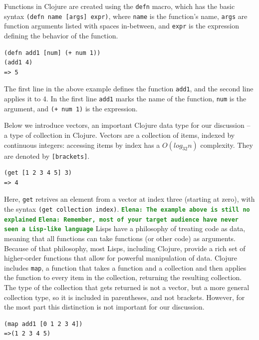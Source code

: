 \documentclass[12pt]{article}
\newcommand{\comment}[1]{{\bf \tt  {#1}}}
\newcommand{\emcomment}[1]{\textcolor{ForestGreen}{\comment{Elena: {#1}}}}
\newcommand{\clocode}[1]{{\texttt {#1}}}
\begin{document}
Functions in Clojure are created using the \clocode{defn} macro, which has the basic syntax \clocode{(defn name [args] expr)}, where \clocode{name} is the function's name, \clocode{args} are function arguments listed with spaces in-between, and \clocode{expr} is the expression defining the behavior of the function. 
\begin{verbatim}
(defn add1 [num] (+ num 1))
(add1 4)
=> 5
\end{verbatim} 
The first line in the above example defines the function \clocode{add1}, and the second line applies it to 4. In the first line \clocode{add1} marks the name of the function, \clocode{num} is the argument, and \clocode{(+ num 1)} is the expression.

Below we introduce vectors, an important Clojure data type for our discussion -- a type of collection in Clojure. Vectors are a collection of items, indexed by continuous integers: accessing items by index has a $O(log_{32}n)$  complexity. They are denoted by 
\clocode{[brackets]}.
\begin{verbatim}
(get [1 2 3 4 5] 3)
=> 4
\end{verbatim}
Here, \clocode{get} retrives an element from a vector at index three (starting at zero), with the syntax \clocode{(get collection index)}.
\emcomment{The example above is still no explained}
\emcomment{Remember, most of your target audience have never seen a Lisp-like language}
Lisps have a philosophy of treating code as data, meaning that all functions can take functions (or other code) as arguments. Because of that philosophy, most Lisps, including Clojure, provide a rich set of higher-order functions that allow for powerful manipulation of data. Clojure includes \clocode{map}, a function that takes a function and a collection and then applies the function to every item in the collection, returning the resulting collection. The type of the collection that gets returned is not a vector, but a more general collection type, so it is included in parentheses, and not brackets. However, for the most part this distinction is not important for our discussion. 
\begin{verbatim}
(map add1 [0 1 2 3 4])
=>(1 2 3 4 5)
\end{verbatim}
\end{document}
